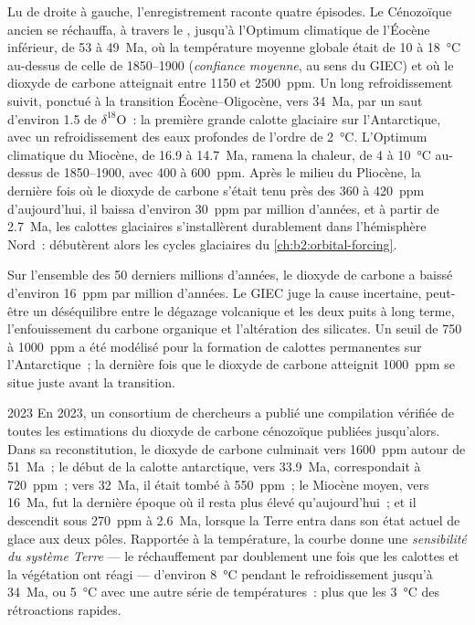 Lu de droite à gauche, l'enregistrement raconte quatre épisodes. Le Cénozoïque ancien se réchauffa, à travers le
, jusqu'à l'Optimum climatique de l'Éocène inférieur, de 53 à \qty{49}{Ma}, où la
température moyenne globale était de 10 à \qty{18}{\celsius} au-dessus de celle de 1850--1900 (\emph{confiance moyenne},
au sens du GIEC) et où le dioxyde de carbone atteignait entre 1150 et \qty{2500}{ppm}. Un long refroidissement suivit,
ponctué à la transition Éocène--Oligocène, vers \qty{34}{Ma}, par un saut d'environ \qty{1.5}{\permil} de $\delta^{18}$O~:
la première grande calotte glaciaire sur l'Antarctique, avec un refroidissement des eaux profondes de l'ordre de
\qty{2}{\celsius}. L'Optimum climatique du Miocène, de 16.9 à \qty{14.7}{Ma}, ramena la chaleur, de 4 à \qty{10}{\celsius}
au-dessus de 1850--1900, avec 400 à \qty{600}{ppm}. Après le milieu du Pliocène, la dernière fois où le dioxyde de carbone
s'était tenu près des 360 à \qty{420}{ppm} d'aujourd'hui, il baissa d'environ \qty{30}{ppm} par million d'années, et à partir de
\qty{2.7}{Ma}, les calottes glaciaires s'installèrent durablement dans l'hémisphère Nord~: débutèrent alors
les cycles glaciaires du \cref{ch:b2:orbital-forcing}.

Sur l'ensemble des 50 derniers millions d'années, le dioxyde de carbone a baissé d'environ \qty{16}{ppm} par million
d'années. Le GIEC juge la cause incertaine, peut-être un déséquilibre entre le dégazage volcanique et les deux
puits à long terme, l'enfouissement du carbone organique et l'altération des silicates. Un seuil de 750 à
\qty{1000}{ppm} a été modélisé pour la formation de calottes permanentes sur l'Antarctique~; la dernière fois que le
dioxyde de carbone atteignit \qty{1000}{ppm} se situe juste avant la transition.

\begin{dated}{2023}
En 2023, un consortium de chercheurs a publié une compilation vérifiée de toutes les estimations du dioxyde de carbone
cénozoïque publiées jusqu'alors. Dans sa reconstitution, le dioxyde de carbone culminait vers \qty{1600}{ppm} autour de
\qty{51}{Ma}~; le début de la calotte antarctique, vers \qty{33.9}{Ma}, correspondait à \qty{720}{ppm}~; vers
\qty{32}{Ma}, il était tombé à \qty{550}{ppm}~; le Miocène moyen, vers \qty{16}{Ma}, fut la dernière époque où il resta
plus élevé qu'aujourd'hui~; et il descendit sous \qty{270}{ppm} à \qty{2.6}{Ma}, lorsque la Terre entra dans son état
actuel de glace aux deux pôles. Rapportée à la température, la courbe donne une
\emph{sensibilité du système Terre} --- le réchauffement par doublement une fois que les calottes et la végétation ont
réagi --- d'environ \qty{8}{\celsius} pendant le refroidissement jusqu'à \qty{34}{Ma}, ou \qty{5}{\celsius}
avec une autre série de températures~: plus que les \qty{3}{\celsius} des rétroactions rapides.
\end{dated}

